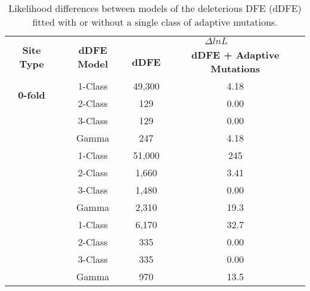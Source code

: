 \begin{table}[h!]
\centering
\caption[Likelihood differences between models of the dDFE fitted with or without a single class of adaptive mutations]{Likelihood differences between models of the deleterious DFE (dDFE) fitted with or without a single class of adaptive mutations.}
 \begin{tabular}{c c c c } 

\toprule
\multirow{2}{*}{\textbf{Site Type}} 	& \multirow{2}{*}{\textbf{dDFE Model}}& 	\multicolumn{2}{c}{\textbf{$\Delta lnL$}} \\
    &  &   \textbf{dDFE}	 & \textbf{dDFE + Adaptive Mutations} \\ \hline
\multirow{2}{*}{\textbf{0-fold}} &	1-Class	&49,300	&4.18 \\
	   &2-Class	&129 	&0.00 \\
	   &3-Class	&129	    &0.00 \\
	   &Gamma	&247	 	&4.18 \\ \hdashline
\multirow{2}{*}{\textbf{CNE}}	   &1-Class	&51,000	&245 \\
	   &2-Class	&1,660	&3.41 \\
	   &3-Class	&1,480	&0.00 \\
	   &Gamma	&2,310	&19.3 \\ \hdashline
\multirow{2}{*}{\textbf{UTR}}	   &1-Class	&6,170	&32.7 \\
	   &2-Class	&335	    &0.00 \\
	   &3-Class	&335	    &0.00 \\
	   &Gamma	&970	    &13.5 \\
\bottomrule

\end{tabular}
\label{tab:C3S4}
\end{table}